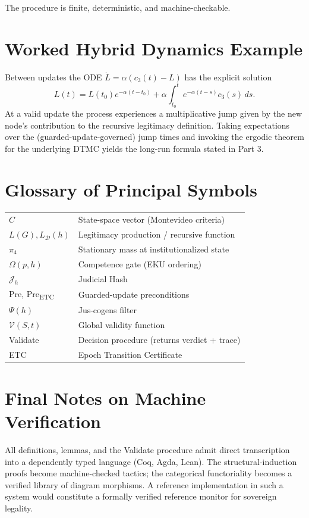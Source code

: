 \documentclass[11pt,a4paper]{article}
\begin{document}
\begin{appendix}
The procedure is finite, deterministic, and machine-checkable.

\section{Worked Hybrid Dynamics Example}
Between updates the ODE \(\dot{L} = \alpha (c_3(t) - L)\) has the explicit solution
\[
L(t) = L(t_0) e^{-\alpha (t - t_0)} + \alpha \int_{t_0}^t e^{-\alpha (t - s)} c_3(s) \, ds.
\]
At a valid update the process experiences a multiplicative jump given by the new node’s contribution to the recursive legitimacy definition. Taking expectations over the (guarded-update-governed) jump times and invoking the ergodic theorem for the underlying DTMC yields the long-run formula stated in Part 3.

\section{Glossary of Principal Symbols}
\begin{tabular}{ll}
\( C \) & State-space vector (Montevideo criteria) \\
\( L(G), L_{\mathcal{D}}(h) \) & Legitimacy production / recursive function \\
\( \pi_4 \) & Stationary mass at institutionalized state \\
\( \Omega(p, h) \) & Competence gate (EKU ordering) \\
\( \mathcal{J}_h \) & Judicial Hash \\
Pre, Pre\textsubscript{ETC} & Guarded-update preconditions \\
\( \Psi(h) \) & Jus-cogens filter \\
\( \mathcal{V}(S, t) \) & Global validity function \\
Validate & Decision procedure (returns verdict + trace) \\
ETC & Epoch Transition Certificate \\
\end{tabular}

\section{Final Notes on Machine Verification}
All definitions, lemmas, and the Validate procedure admit direct transcription into a dependently typed language (Coq, Agda, Lean). The structural-induction proofs become machine-checked tactics; the categorical functoriality becomes a verified library of diagram morphisms. A reference implementation in such a system would constitute a formally verified reference monitor for sovereign legality.

\end{appendix}
\end{document}
